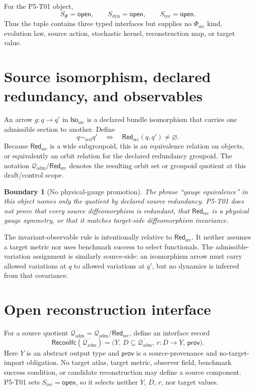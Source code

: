 \documentclass[11pt]{article}
\newcommand{\Qadm}{\mathcal Q_{\mathrm{adm}}}
\newcommand{\Isosrc}{\mathsf{Iso}_{\mathrm{src}}}
\newcommand{\Redsrc}{\mathsf{Red}_{\mathrm{src}}}
\newcommand{\PhiSrc}{\Phi_{\mathrm{src}}}
\newcommand{\Open}{\mathsf{open}}
\newcommand{\Recon}{\mathsf{ReconIfc}}
\newtheorem{boundary}{Boundary}
\begin{document}
For the P5-T01 object,
\[
 S_{\Phi}=\Open,\qquad
 S_{\mathrm{dyn}}=\Open,\qquad
 S_{\mathrm{rec}}=\Open.
\]
Thus the tuple contains three typed interfaces but supplies no
\(\PhiSrc\) kind, evolution law, source action, stochastic kernel,
reconstruction map, or target value.

\section{Source isomorphism, declared redundancy, and observables}

An arrow \(g:q\to q'\) in \(\Isosrc\) is a declared bundle isomorphism that
carries one admissible section to another. Define
\[
  q\sim_{\mathrm{red}}q'
  \quad\Longleftrightarrow\quad
  \Redsrc(q,q')\ne\varnothing .
\]
Because \(\Redsrc\) is a wide subgroupoid, this is an equivalence relation on
objects, or equivalently an orbit relation for the declared redundancy
groupoid. The notation \(\Qadm/\Redsrc\) denotes the resulting orbit set or
groupoid quotient at this draft/control scope.

\begin{boundary}[No physical-gauge promotion]
The phrase ``gauge equivalence'' in this object names only the quotient by
declared source redundancy. P5-T01 does not prove that every source
diffeomorphism is redundant, that \(\Redsrc\) is a physical gauge symmetry,
or that it matches target-side diffeomorphism invariance.
\end{boundary}

The invariant-observable rule is intentionally relative to \(\Redsrc\).
It neither assumes a target metric nor uses benchmark success to select
functionals. The admissible-variation assignment is similarly source-side:
an isomorphism arrow must carry allowed variations at \(q\) to allowed
variations at \(q'\), but no dynamics is inferred from that covariance.

\section{Open reconstruction interface}

For a source quotient \(\overline{\Qadm}=\Qadm/\Redsrc\), define an interface
record
\[
  \Recon(\overline{\Qadm})
  =
  \bigl(
    Y,\,
    D\subseteq\overline{\Qadm},\,
    r:D\to Y,\,
    \mathsf{prov}
  \bigr).
\]
Here \(Y\) is an abstract output type and \(\mathsf{prov}\) is a
source-provenance and no-target-import obligation. No target atlas, target
metric, observer field, benchmark success condition, or candidate
reconstruction may define a source component. P5-T01 sets
\(S_{\mathrm{rec}}=\Open\), so it selects neither \(Y\), \(D\), \(r\), nor
target values.
\end{document}
